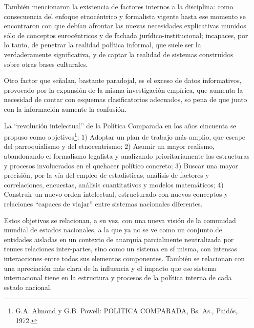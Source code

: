 \documentclass[
]{book}
\begin{document}
También mencionaron la existencia de factores internos a la disciplina: como consecuencia del enfoque etnocéntrico y formalista vigente hasta ese momento se encontraron con que debían afrontar las nuevas necesidades explicativas munidos sólo de conceptos eurocéntricos y de fachada jurídico-institucional; incapaces, por lo tanto, de penetrar la realidad política informal, que suele ser la verdaderamente significativa, y de captar la realidad de sistemas construídos sobre otras bases culturales.

Otro factor que señalan, bastante paradojal, es el exceso de datos informativos, provocado por la expansión de la misma investigación empírica, que aumenta la necesidad de contar con esquemas clasificatorios adecuados, so pena de que junto con la información aumente la confusión.

La ``revolución intelectual'' de la Política Comparada en los años cincuenta se propuso como objetivos\footnote{G.A. Almond y G.B. Powell: POLITICA COMPARADA, Bs. As., Paidós, 1972.}: 1) Adoptar un plan de trabajo más amplio, que escape del parroquialismo y del etnocentrismo; 2) Asumir un mayor realismo, abandonando el formalismo legalista y analizando prioritariamente las estructuras y procesos involucrados en el quehacer político concreto; 3) Buscar una mayor precisión, por la vía del empleo de estadísticas, análisis de factores y correlaciones, encuestas, análisis cuantitativos y modelos matemáticos; 4) Construir un nuevo orden intelectual, estructurado con nuevos conceptos y relaciones ``capaces de viajar'' entre sistemas nacionales diferentes.

Estos objetivos se relacionan, a su vez, con una nueva visión de la comunidad mundial de estados nacionales, a la que ya no se ve como un conjunto de entidades aisladas en un contexto de anarquía parcialmente neutralizada por tenues relaciones inter-partes, sino como un sistema en sí misma, con intensas interacciones entre todos sus elementos componentes. También se relacionan con una apreciación más clara de la influencia y el impacto que ese sistema internacional tiene en la estructura y procesos de la política interna de cada estado nacional.
\end{document}
